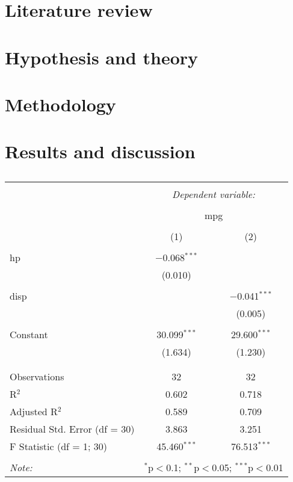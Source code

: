 \documentclass[a4paper, 11pt]{article}
\begin{document}
\section*{Literature review}
\section*{Hypothesis and theory}
\section*{Methodology}
\section*{Results and discussion}




\begin{table}[!htbp] \centering 
  \caption{} 
  \label{} 
\begin{tabular}{@{\extracolsep{5pt}}lcc} 
\\[-1.8ex]\hline 
\hline \\[-1.8ex] 
 & \multicolumn{2}{c}{\textit{Dependent variable:}} \\ 
\cline{2-3} 
\\[-1.8ex] & \multicolumn{2}{c}{mpg} \\ 
\\[-1.8ex] & (1) & (2)\\ 
\hline \\[-1.8ex] 
 hp & $-$0.068$^{***}$ &  \\ 
  & (0.010) &  \\ 
  & & \\ 
 disp &  & $-$0.041$^{***}$ \\ 
  &  & (0.005) \\ 
  & & \\ 
 Constant & 30.099$^{***}$ & 29.600$^{***}$ \\ 
  & (1.634) & (1.230) \\ 
  & & \\ 
\hline \\[-1.8ex] 
Observations & 32 & 32 \\ 
R$^{2}$ & 0.602 & 0.718 \\ 
Adjusted R$^{2}$ & 0.589 & 0.709 \\ 
Residual Std. Error (df = 30) & 3.863 & 3.251 \\ 
F Statistic (df = 1; 30) & 45.460$^{***}$ & 76.513$^{***}$ \\ 
\hline 
\hline \\[-1.8ex] 
\textit{Note:}  & \multicolumn{2}{r}{$^{*}$p$<$0.1; $^{**}$p$<$0.05; $^{***}$p$<$0.01} \\ 
\end{tabular} 
\end{table} 
\end{document}
